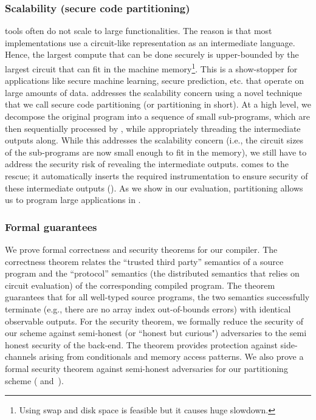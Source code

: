 \subsubsection{Scalability (secure code partitioning)} \mpc tools
often do not scale to large functionalities. The reason is that
most \mpc implementations use a circuit-like representation as an
intermediate language. Hence, the largest compute that can be done
securely is upper-bounded by the largest circuit that can fit in the
machine memory\footnote{Using swap and
disk space is feasible but it causes huge slowdown.}. This is a
show-stopper for applications like secure machine learning, secure
prediction, etc. that operate on large amounts of data.
\tool addresses the scalability concern using a novel technique that
we call secure code partitioning (or partitioning in short). At
a high level, we decompose the original program into a sequence of small
sub-programs, which are then sequentially processed by \tool, while
appropriately threading the intermediate outputs
along. While this
addresses the scalability concern (i.e., the circuit
sizes of the sub-programs are now small enough to fit in the memory),
we still have to address
the security risk of revealing the intermediate outputs. \tool comes
to the rescue; it automatically inserts the required instrumentation
to ensure security of these intermediate outputs (). As
we show in our
evaluation, partitioning allows us to program large applications
in \tool. 


\subsubsection{Formal guarantees} We prove formal correctness and
security theorems for our compiler. The correctness theorem relates the
``trusted third party'' semantics of a source
program and the ``protocol'' semantics (the distributed \mpc
semantics that relies on circuit evaluation) of the corresponding
compiled program. The theorem
guarantees that for all well-typed source programs, the two semantics
successfully terminate
(e.g., there are no array index out-of-bounds errors) with identical
observable outputs. For
the security theorem, we formally reduce the security
of our scheme against semi-honest (or ``honest but curious")
adversaries to the semi honest security of the  \mpc back-end. The
theorem provides protection against side-channels arising from
conditionals and memory access patterns.
 We also prove a formal security theorem against semi-honest
 adversaries for our partitioning
scheme ( and~).

